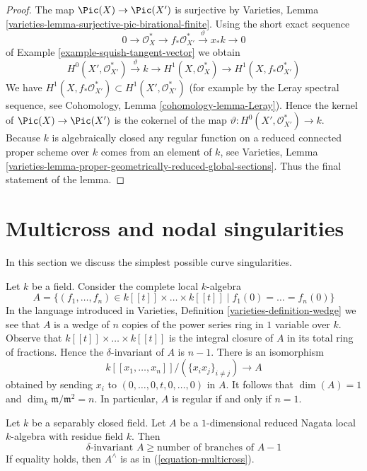 \begin{proof}
The map $\Pic(X) \to \Pic(X')$ is surjective
by Varieties, Lemma \ref{varieties-lemma-surjective-pic-birational-finite}.
Using the short exact sequence
$$
0 \to \mathcal{O}_X^* \to f_*\mathcal{O}_{X'}^*
\xrightarrow{\vartheta} x_*k \to 0
$$
of Example \ref{example-squish-tangent-vector} we obtain
$$
H^0(X', \mathcal{O}_{X'}^*) \xrightarrow{\vartheta} k \to
H^1(X, \mathcal{O}_X^*) \to H^1(X, f_*\mathcal{O}_{X'}^*)
$$
We have $H^1(X, f_*\mathcal{O}_{X'}^*) \subset H^1(X', \mathcal{O}_{X'}^*)$
(for example by the Leray spectral sequence, see
Cohomology, Lemma \ref{cohomology-lemma-Leray}).
Hence the kernel of $\Pic(X) \to \Pic(X')$ is the
cokernel of the map $\vartheta : H^0(X', \mathcal{O}_{X'}^*) \to k$.
Because $k$ is algebraically closed any regular function on a
reduced connected proper scheme over $k$ comes from an element of $k$, see
Varieties, Lemma
\ref{varieties-lemma-proper-geometrically-reduced-global-sections}.
Thus the final statement of the lemma.
\end{proof}


\section{Multicross and nodal singularities}
\label{section-multicross}

\noindent
In this section we discuss the simplest possible curve singularities.

\medskip\noindent
Let $k$ be a field. Consider the complete local $k$-algebra
\begin{equation}
\label{equation-multicross}
A = \{(f_1, \ldots, f_n) \in k[[t]] \times \ldots \times k[[t]] \mid
f_1(0) = \ldots = f_n(0)\}
\end{equation}
In the language introduced in
Varieties, Definition \ref{varieties-definition-wedge}
we see that $A$ is a wedge of $n$ copies of the power series
ring in $1$ variable over $k$. Observe that
$k[[t]] \times \ldots \times k[[t]]$
is the integral closure of $A$ in its total ring of fractions.
Hence the $\delta$-invariant of $A$ is $n - 1$.
There is an isomorphism
$$
k[[x_1, \ldots, x_n]]/(\{x_ix_j\}_{i \not = j}) \longrightarrow A
$$
obtained by sending $x_i$ to $(0, \ldots, 0, t, 0, \ldots, 0)$
in $A$. It follows that $\dim(A) = 1$ and
$\dim_k \mathfrak m/\mathfrak m^2 = n$.
In particular, $A$ is regular if and only if $n = 1$.

\begin{lemma}
\label{lemma-multicross-algebra}
Let $k$ be a separably closed field. Let $A$ be a $1$-dimensional
reduced Nagata local $k$-algebra with residue field $k$. Then
$$
\delta\text{-invariant }A \geq \text{number of branches of }A - 1
$$
If equality holds, then $A^\wedge$ is as in (\ref{equation-multicross}).
\end{lemma}

